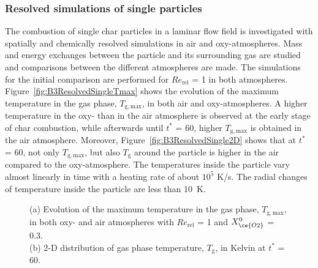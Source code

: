 \begin{btUnit}
\subsubsection{Resolved simulations of single particles}
The combustion of single char particles in a laminar flow field is investigated with spatially and chemically resolved simulations in air and oxy-atmospheres. Mass and energy exchanges between the particle and its surrounding gas are studied and comparisons between the different atmospheres are made. The simulations for the initial comparison are performed for $Re_\mathrm{rel}$ = 1 in both atmospheres. Figure~\ref{fig:B3ResolvedSingleTmax} shows the evolution of the maximum temperature in the gas phase, $T_\mathrm{g,max}$, in both air and oxy-atmospheres. A higher temperature in the oxy- than in the air atmosphere is observed at the early stage of char combustion, while afterwards until $t^{\ast}$ = 60, higher $T_\mathrm{g,max}$ is obtained in the air atmosphere. Moreover, Figure~\ref{fig:B3ResolvedSingle2D} shows that at $t^{\ast}$ = 60, not only $T_\mathrm{g,max}$, but also $T_\mathrm{g}$ around the particle is higher in the air compared to the oxy-atmosphere. The temperatures inside the particle vary almost linearly in time with a heating rate of about $10^{5}$ K/s. The radial changes of temperature inside the particle are less than \SI{10}{K}.
\begin{figure}[h]
    \hfill
	\caption{(a) Evolution of the maximum temperature in the gas phase, $T_\mathrm{g,max}$, in both oxy- and air atmospheres with $Re_\mathrm{rel}$ = 1 and $X^{0}_{\ce{O2}}$ = 0.3.\\(b) 2-D distribution of gas phase temperature, $T_\mathrm{g}$, in Kelvin at $t^{\ast}$ = 60.}\label{fig:B3ResolvedSingle}
\end{figure}
%

\end{btUnit}
